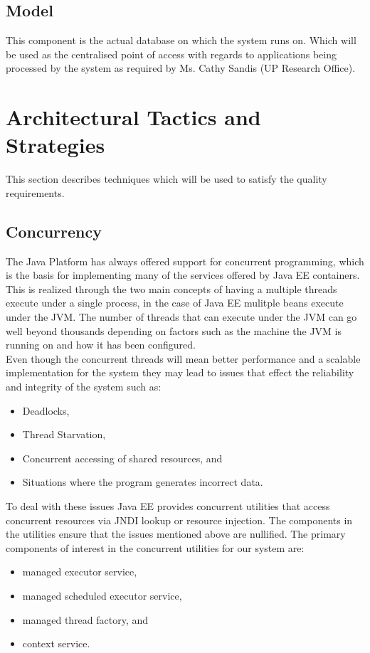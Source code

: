 \documentclass[12pt]{article}
\newcommand{\client}{Ms. Cathy Sandis (UP Research Office)}
\begin{document}
\subsection*{Model}
This component is the actual database on which the system runs on. Which will be used as the centralised point of access with regards to applications being processed by the system as required by \client .
 
\section{Architectural Tactics and Strategies} %
This section describes techniques which will be used to satisfy the quality requirements. 

\subsection{Concurrency}
The Java Platform has always offered support for concurrent programming, which is the basis for implementing many of the services offered by Java EE containers. This is realized through the two main concepts of having a multiple threads execute under a single process, in the case of Java EE mulitple beans execute under the JVM. The number of threads that can execute under the JVM can go well beyond thousands depending on factors such as the machine the JVM is running on and how it has been configured.\\

Even though the concurrent threads will mean better performance and a scalable implementation for the system they may lead to issues that effect the reliability and integrity of the system such as:
\begin{itemize}
\item Deadlocks,
\item Thread Starvation,
\item Concurrent  accessing of shared resources, and
\item Situations where the program generates incorrect data.
\end{itemize}

To deal with these issues Java EE provides concurrent utilities that access concurrent resources via JNDI lookup or resource injection. The components in the utilities ensure that the issues mentioned above are nullified. The primary components of interest in the concurrent utilities for our system are:
\begin{itemize}
\item managed executor service, 
\item managed scheduled executor service, 
\item managed thread factory, and 
\item context service.
\end{itemize}
\end{document}
